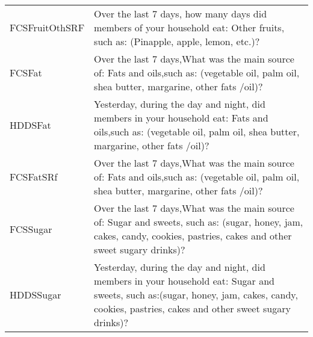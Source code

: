 \documentclass[
]{article}
\begin{document}
\begin{longtable}[]{@{}ll@{}}
\begin{minipage}[t]{0.22\columnwidth}
FCSFruitOthSRF\strut
\end{minipage} & \begin{minipage}[t]{0.72\columnwidth}\raggedright
Over the last 7 days, how many days did members of your household eat: Other fruits, such as: (Pinapple, apple, lemon, etc.)?\strut
\end{minipage}\tabularnewline
\begin{minipage}[t]{0.22\columnwidth}\raggedright
FCSFat\strut
\end{minipage} & \begin{minipage}[t]{0.72\columnwidth}\raggedright
Over the last 7 days,What was the main source of: Fats and oils,such as: (vegetable oil, palm oil, shea butter, margarine, other fats /oil)?\strut
\end{minipage}\tabularnewline
\begin{minipage}[t]{0.22\columnwidth}\raggedright
HDDSFat\strut
\end{minipage} & \begin{minipage}[t]{0.72\columnwidth}\raggedright
Yesterday, during the day and night, did members in your household eat: Fats and oils,such as: (vegetable oil, palm oil, shea butter, margarine, other fats /oil)?\strut
\end{minipage}\tabularnewline
\begin{minipage}[t]{0.22\columnwidth}\raggedright
FCSFatSRf\strut
\end{minipage} & \begin{minipage}[t]{0.72\columnwidth}\raggedright
Over the last 7 days,What was the main source of: Fats and oils,such as: (vegetable oil, palm oil, shea butter, margarine, other fats /oil)?\strut
\end{minipage}\tabularnewline
\begin{minipage}[t]{0.22\columnwidth}\raggedright
FCSSugar\strut
\end{minipage} & \begin{minipage}[t]{0.72\columnwidth}\raggedright
Over the last 7 days,What was the main source of: Sugar and sweets, such as: (sugar, honey, jam, cakes, candy, cookies, pastries, cakes and other sweet sugary drinks)?\strut
\end{minipage}\tabularnewline
\begin{minipage}[t]{0.22\columnwidth}\raggedright
HDDSSugar\strut
\end{minipage} & \begin{minipage}[t]{0.72\columnwidth}\raggedright
Yesterday, during the day and night, did members in your household eat: Sugar and sweets, such as:(sugar, honey, jam, cakes, candy, cookies, pastries, cakes and other sweet sugary drinks)?\strut

\end{minipage}
\end{longtable}
\end{document}
